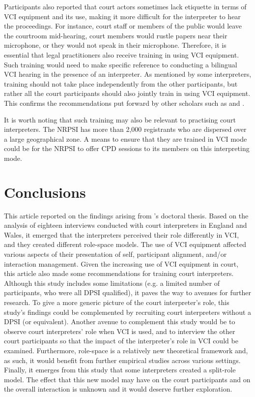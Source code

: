 \documentclass[output=paper]{langsci/langscibook}
\begin{document}
Participants also reported that court actors sometimes lack etiquette in terms of \textsc{VCI} equipment and its use, making it more difficult for the interpreter to hear the proceedings. For instance, court staff or members of the public would leave the courtroom mid-hearing, court members would rustle papers near their microphone, or they would not speak in their microphone. Therefore, it is essential that legal practitioners also receive training in using \textsc{VCI} equipment. Such training would need to make specific reference to conducting a bilingual \textsc{VCI} hearing in the presence of an interpreter. As mentioned by some interpreters, training should not take place independently from the other participants, but rather all the court participants should also jointly train in using \textsc{VCI} equipment. This confirms the recommendations put forward by other scholars such as \citet{Braun2011a} and \citet{Fowler2012}. 

It is worth noting that such training may also be relevant to practising court interpreters. The \textsc{NRPSI} has more than 2,000 registrants who are dispersed over a large geographical zone. A means to ensure that they are trained in \textsc{VCI} mode could be for the \textsc{NRPSI} to offer \textsc{CPD} sessions to its members on this interpreting mode. 

\section{Conclusions}
This article reported on the findings arising from \citet{Devaux2017b}’s doctoral thesis. Based on the analysis of eighteen interviews conducted with court interpreters in England and Wales, it emerged that the interpreters perceived their role differently in \textsc{VCI}, and they created different role-space models. The use of \textsc{VCI} equipment affected various aspects of their presentation of self, participant alignment, and/or interaction management. Given the increasing use of \textsc{VCI} equipment in court, this article also made some recommendations for training court interpreters. Although this study includes some limitations (e.g. a limited number of participants, who were all \textsc{DPSI} qualified), it paves the way to avenues for further research. To give a more generic picture of the court interpreter’s role, this study’s findings could be complemented by recruiting court interpreters without a \textsc{DPSI} (or equivalent). Another avenue to complement this study would be to observe court interpreters’ role when \textsc{VCI} is used, and to interview the other court participants so that the impact of the interpreter’s role in \textsc{VCI} could be examined. Furthermore, role-space is a relatively new theoretical framework and, as such, it would benefit from further empirical studies across various settings. Finally, it emerges from this study that some interpreters created a split-role model. The effect that this new model may have on the court participants and on the overall interaction is unknown and it would deserve further exploration. 

{\sloppy\printbibliography[heading=subbibliography,notkeyword=this]} 
\end{document}
